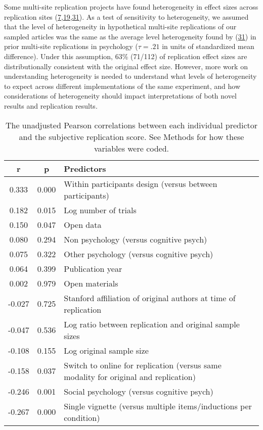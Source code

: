 \documentclass[
  english,
  a4paper,
]{article}
\begin{document}
Some multi-site replication projects have found heterogeneity in effect sizes across replication sites (\protect\hyperlink{ref-klein2018}{7},\protect\hyperlink{ref-ebersole2020}{19},\protect\hyperlink{ref-olsson2020}{31}). As a test of sensitivity to heterogeneity, we assumed that the level of heterogeneity in hypothetical multi-site replications of our sampled articles was the same as the average level heterogeneity found by (\protect\hyperlink{ref-olsson2020}{31}) in prior multi-site replications in psychology (\(\tau=.21\) in units of standardized mean difference). Under this assumption, 63\% (71/112) of replication effect sizes are distributionally consistent with the original effect size. However, more work on understanding heterogeneity is needed to understand what levels of heterogeneity to expect across different implementations of the same experiment, and how considerations of heterogeneity should impact interpretations of both novel results and replication results.

\begin{table}[!h]

\caption{\label{tab:cor}The unadjusted Pearson correlations between each individual predictor and the subjective replication score. See Methods for how these variables were coded.}
\centering
\fontsize{10}{12}\selectfont
\begin{tabular}[t]{ccl}
\toprule
r & p & Predictors\\
\midrule
0.333 & 0.000 & Within participants design (versus between participants)\\
0.182 & 0.015 & Log number of  trials\\
0.150 & 0.047 & Open data\\
0.080 & 0.294 & Non psychology (versus cognitive psych)\\
0.075 & 0.322 & Other psychology (versus cognitive psych)\\
0.064 & 0.399 & Publication year\\
0.002 & 0.979 & Open materials\\
-0.027 & 0.725 & Stanford affiliation of original authors at time of replication\\
-0.047 & 0.536 & Log ratio between replication and original sample sizes\\
-0.108 & 0.155 & Log original sample size\\
-0.158 & 0.037 & Switch to online for replication (versus same modality for original and replication)\\
-0.246 & 0.001 & Social psychology (versus cognitive psych)\\
-0.267 & 0.000 & Single vignette (versus multiple items/inductions per condition)\\
\bottomrule
\end{tabular}
\end{table}
\end{document}
